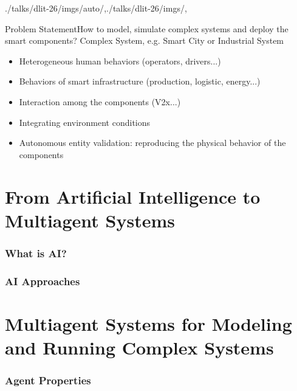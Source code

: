 \localized

\begin{bibliographysection}
\begin{graphicspathcontext}{{./talks/dlit-26/imgs/auto/},{./talks/dlit-26/imgs/},\old}

\begin{righttitleframe}{Problem Statement}{How to model, simulate complex systems and deploy the smart components?}
	{\larger Complex System, e.g. Smart City or Industrial System}
	\begin{itemize}
		\item Heterogeneous human behaviors (operators, drivers...)
		\item Behaviors of smart infrastructure (production, logistic, energy...)
		\item Interaction among the components (V2x...)
		\item Integrating environment conditions
		\item Autonomous entity validation: reproducing the physical behavior of the components
	\end{itemize}
\end{righttitleframe}

\tableofcontentslide[onlyparts]

\part{From Artificial Intelligence to Multiagent Systems}

\section{What is AI?}
\localized

\section{AI Approaches}
\localized
\localized

\part{Multiagent Systems for Modeling and Running Complex Systems}

\section{Agent Properties}


\end{graphicspathcontext}
\end{bibliographysection}

